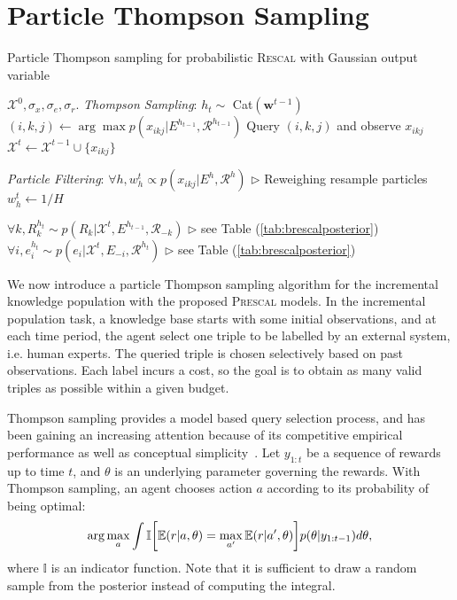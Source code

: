 \section{Particle Thompson Sampling}
\label{sec:pts}

\begin{algorithm}[t!]
   \caption{Particle Thompson sampling for probabilistic \textsc{Rescal} with Gaussian output variable}
   \label{alg:smc}
\begin{algorithmic}
    $\mathcal{X}^{0}, \sigma_x, \sigma_e, \sigma_r$.
   \STATE \textit{Thompson Sampling}:
   \STATE $h_t \sim $ Cat$(\mathbf{w}^{t-1})$
   \STATE $(i,k,j) \leftarrow \arg\max p(x_{ikj}| E^{h_{t-1}}, \mathcal{R}^{h_{t-1}})$
   \STATE Query $(i,k,j)$ and observe $x_{ikj}$
   \STATE $\mathcal{X}^{t} \leftarrow \mathcal{X}^{t-1} \cup \{x_{ikj}\}$

   \STATE \textit{Particle Filtering}:
   \STATE $\forall h, w_h^{t} \propto p(x_{ikj} | E^{h}, \mathcal{R}^{h})$   \hfill $\triangleright$ Reweighing
   \STATE resample particles
   \STATE $w_h^{t} \leftarrow 1/H$
   \ENDIF

   \STATE $\forall k, R_k^{h_t} \sim p(R_k | \mathcal{X}^{t}, E^{h_{t-1}}, \mathcal{R}_{-k})$   \hfill $\triangleright$ see Table (\ref{tab:brescalposterior})
   \STATE $\forall i, e^{h_t}_i \sim p(e_i | \mathcal{X}^{t}, E_{-i}, \mathcal{R}^{h_{t}})$ \hfill $\triangleright$ see Table (\ref{tab:brescalposterior})
   \ENDFOR

   \ENDFOR
\end{algorithmic}
\end{algorithm}

We now introduce a particle Thompson sampling algorithm for the incremental knowledge population with the proposed \textsc{Prescal} models. In the incremental population task, a knowledge base starts with some initial observations, and at each time period, the agent select one triple to be labelled by an external system, i.e. human experts. The queried triple is chosen selectively based on past observations. Each label incurs a cost, so the goal is to obtain as many valid triples as possible within a given budget.

Thompson sampling provides a model based query selection process, and has been gaining an increasing attention
because of its competitive empirical performance as well as conceptual
simplicity~\cite{li11thompson,scott10bandit}. Let $y_{1:t}$ be a sequence of rewards up to time $t$, and $\theta$ is an underlying parameter governing the rewards. With Thompson sampling, an agent chooses action $a$ according to its probability of being optimal:
\begin{align}
\arg\max_a \int \mathbb{I}\bigg[ \mathbb{E}(r|a, \theta)
= \max_{a'}\mathbb{E}(r|a',\theta) \bigg] p(\theta|y_{1:t-1}) d\theta, \notag
\end{align}
where $\mathbb{I}$ is an indicator function. Note that it is sufficient
to draw a random sample from the posterior instead of computing the integral.

